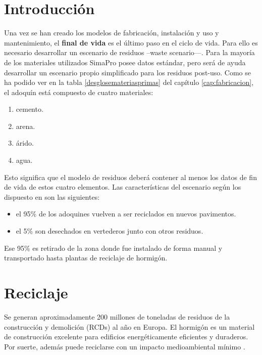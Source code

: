 \section{Introducción}
Una vez se han creado los modelos de fabricación, instalación y uso y mantenimiento, el \textbf{final de vida} es el último paso en el ciclo de vida. Para ello es necesario desarrollar un escenario de residuos –waste scenario—. Para la mayoría de los materiales utilizados SimaPro posee datos estándar, pero será de ayuda desarrollar un escenario propio simplificado para los residuos post-uso. Como se ha podido ver en la tabla \ref{desglosemateriasprimas} del capítulo \ref{cap:fabricacion}, el adoquín está compuesto de cuatro materiales:

\begin{enumerate}
  \item cemento.
  \item arena.
  \item árido.
  \item agua.
\end{enumerate}

Esto significa que el modelo de residuos deberá contener al menos los datos de fin de vida de estos cuatro elementos. Las características del escenario según los dispuesto en \cite{euroadoquin} son las siguientes:
\begin{itemize}
  \item el 95\% de los adoquines vuelven a ser reciclados en nuevos pavimentos.
  \item el 5\% son desechados en vertederos junto con otros residuos.
\end{itemize}

Ese 95\% es retirado de la zona donde fue instalado de forma manual y transportado hasta plantas de reciclaje de hormigón.

\section{Reciclaje}

Se generan aproximadamente 200 millones de toneladas de residuos de la construcción y demolición (RCDs) al año en Europa. El hormigón es un material de construcción excelente para edificios energéticamente eficientes y duraderos. Por suerte, además puede reciclarse con un impacto medioambiental mínimo \cite{europeanconcrete}.

